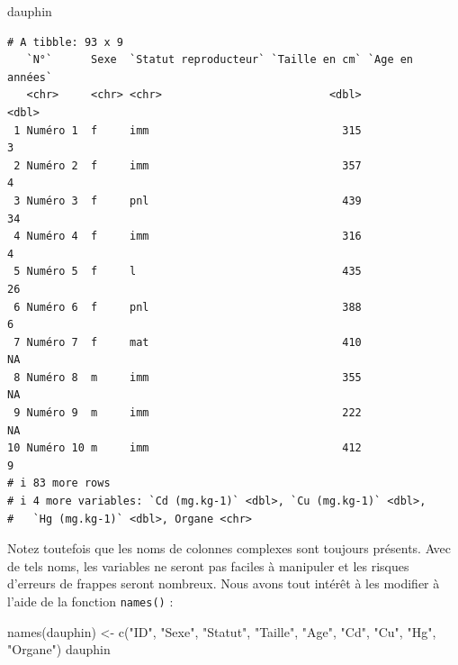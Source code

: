 \documentclass[
  a4paper,
  DIV=11,
  numbers=noendperiod,
  oneside]{scrreprt}
\newenvironment{Shaded}{}{}
\newcommand{\FunctionTok}[1]{\textcolor[rgb]{0.44,0.26,0.76}{#1}}
\newcommand{\NormalTok}[1]{\textcolor[rgb]{0.14,0.16,0.18}{#1}}
\newcommand{\OtherTok}[1]{\textcolor[rgb]{0.44,0.26,0.76}{#1}}
\newcommand{\StringTok}[1]{\textcolor[rgb]{0.01,0.18,0.38}{#1}}
\begin{document}
\begin{Shaded}
\begin{Highlighting}[]
\NormalTok{dauphin}
\end{Highlighting}
\end{Shaded}

\begin{verbatim}
# A tibble: 93 x 9
   `N°`      Sexe  `Statut reproducteur` `Taille en cm` `Age en années`
   <chr>     <chr> <chr>                          <dbl>           <dbl>
 1 Numéro 1  f     imm                              315               3
 2 Numéro 2  f     imm                              357               4
 3 Numéro 3  f     pnl                              439              34
 4 Numéro 4  f     imm                              316               4
 5 Numéro 5  f     l                                435              26
 6 Numéro 6  f     pnl                              388               6
 7 Numéro 7  f     mat                              410              NA
 8 Numéro 8  m     imm                              355              NA
 9 Numéro 9  m     imm                              222              NA
10 Numéro 10 m     imm                              412               9
# i 83 more rows
# i 4 more variables: `Cd (mg.kg-1)` <dbl>, `Cu (mg.kg-1)` <dbl>,
#   `Hg (mg.kg-1)` <dbl>, Organe <chr>
\end{verbatim}

Notez toutefois que les noms de colonnes complexes sont toujours
présents. Avec de tels noms, les variables ne seront pas faciles à
manipuler et les risques d'erreurs de frappes seront nombreux. Nous
avons tout intérêt à les modifier à l'aide de la fonction
\texttt{names()} :

\begin{Shaded}
\begin{Highlighting}[]
\FunctionTok{names}\NormalTok{(dauphin) }\OtherTok{\textless{}{-}} \FunctionTok{c}\NormalTok{(}\StringTok{"ID"}\NormalTok{, }\StringTok{"Sexe"}\NormalTok{, }\StringTok{"Statut"}\NormalTok{, }\StringTok{"Taille"}\NormalTok{,}
                    \StringTok{"Age"}\NormalTok{, }\StringTok{"Cd"}\NormalTok{, }\StringTok{"Cu"}\NormalTok{, }\StringTok{"Hg"}\NormalTok{, }\StringTok{"Organe"}\NormalTok{)}
\NormalTok{dauphin}
\end{Highlighting}
\end{Shaded}
\end{document}
